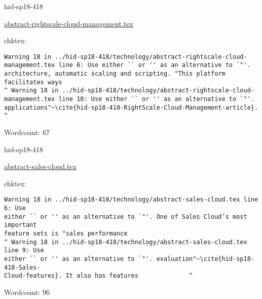 

\begin{IU}

hid-sp18-418

\href{https://github.com/cloudmesh-community/hid-sp18-418/blob/master//technology/abstract-rightscale-cloud-management.tex}{abstract-rightscale-cloud-management.tex}

 
chktex:
\begin{tiny}
\begin{verbatim}
Warning 18 in ../hid-sp18-418/technology/abstract-rightscale-cloud-
management.tex line 6: Use either `` or '' as an alternative to `"'.
architecture, automatic scaling and scripting. "This platform facilitates ways
^ Warning 18 in ../hid-sp18-418/technology/abstract-rightscale-cloud-
management.tex line 10: Use either `` or '' as an alternative to `"'.
applications"~\cite{hid-sp18-418-RightScale-Cloud-Management-article}.
^
\end{verbatim}
\end{tiny}

Wordcount: 67

\end{IU}



\begin{IU}

hid-sp18-418

\href{https://github.com/cloudmesh-community/hid-sp18-418/blob/master//technology/abstract-sales-cloud.tex}{abstract-sales-cloud.tex}

 
chktex:
\begin{tiny}
\begin{verbatim}
Warning 18 in ../hid-sp18-418/technology/abstract-sales-cloud.tex line 6: Use
either `` or '' as an alternative to `"'. One of Sales Cloud’s most important
feature sets is "sales performance
^ Warning 18 in ../hid-sp18-418/technology/abstract-sales-cloud.tex line 9: Use
either `` or '' as an alternative to `"'. evaluation"~\cite{hid-sp18-418-Sales-
Cloud-features}. It also has features              ^
\end{verbatim}
\end{tiny}

Wordcount: 96

\end{IU}



